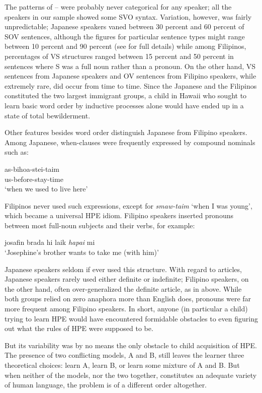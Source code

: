The patterns of -- were probably never categorical for any speaker; all the speakers in our sample showed some SVO syntax. Variation, however, was fairly unpredictable; Japanese speakers vaned between 30 percent and 60 percent of SOV sentences, although the figures for particular sentence types might range between 10 percent and 90 percent (see \citealt{BickertonEtAl1976b} for full details) while among Filipinos, percentages of VS structures ranged between 15 percent and 50 percent in sentences where S was a full noun rather than a pronoun. On the other hand, VS sentences from Japanese speakers and OV sentences from Filipino speakers, while extremely rare, did
occur from time to time. Since the Japanese and the Filipinos constituted the two largest immigrant groups, a child in Hawaii who sought to learn basic word order by inductive processes alone would have ended up in a state of total bewilderment.

Other features besides word order distinguish Japanese from
Filipino speakers. Among Japanese, when-clauses were frequently expressed by compound nominals such as:

\ea\label{ex:10}
\gll  as-bihoa-stei-taim\\
 us-before-stay-time \\
\glt  `when we used to live here'
\z

\noindent Filipinos never used such expressions, except for \textit{smaw-taim} `when I was young', which became a universal HPE idiom. Filipino speakers inserted pronouns between most full-noun subjects and their verbs, for example:

\ea\label{ex:11}
josafin brada hi laik \textit{hapai} mi\\
\glt   `Josephine's brother wants to take me (with him)' 
\z

\noindent Japanese speakers seldom if ever used this structure. With regard to articles, Japanese speakers rarely used either definite or indefinite; Filipino speakers, on the other hand, often over-generalized the definite article, as in  above. While both groups relied on zero anaphora more than English does, pronouns were far more frequent among Filipino speakers. In short, anyone (in particular a child) trying to learn HPE would have encountered formidable obstacles to even figuring out what the rules of HPE were supposed to be.

But its variability was by no means the only obstacle to child acquisition of HPE. The presence of two conflicting models, A and B, still leaves the learner three theoretical choices: learn A, learn B, or learn some mixture of A and B. But when neither of the models, nor the two together, constitutes an adequate variety of human language, the problem is of a different order altogether.

